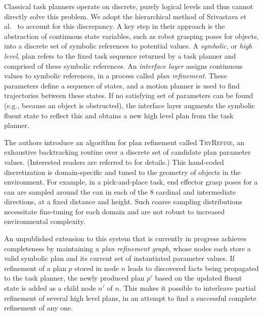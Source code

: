 
Classical task planners operate on discrete, purely logical levels and thus cannot directly
solve this problem. We adopt the hierarchical method of Srivastava et al.~\cite{srivastava2014combined}
to account for this discrepancy. A key step in their approach is the
abstraction of continuous state variables, such as robot grasping poses for objects, into a
discrete set of symbolic references to potential values. A \emph{symbolic}, or \emph{high level}, plan
refers to the fixed task sequence returned by a task planner and comprised of these symbolic references.
An \emph{interface layer} assigns continuous values to symbolic references, in a process called \emph{plan refinement}.
These parameters define a sequence of states, and a motion planner is used to find trajectories between these states.
If no satisfying set of parameters can be found (e.g., because an object is obstructed), the interface layer
augments the symbolic fluent state to reflect this and obtains a new high level plan from the task planner.

The authors introduce an algorithm for plan refinement
called \textsc{TryRefine}, an exhaustive backtracking routine over a discrete set of candidate
plan parameter values. (Interested readers are referred to \cite{srivastava2014combined} for details.)
This hand-coded discretization is domain-specific and tuned to the geometry of objects in the
environment. For example, in a pick-and-place task, end effector grasp poses for a can are
sampled around the can in each of the 8 cardinal and intermediate directions, at a fixed distance and height.
Such coarse sampling distributions necessitate fine-tuning for each domain and are not robust to
increased environmental complexity.

An unpublished extension to this system that is currently in progress achieves completeness by
maintaining a \emph{plan refinement graph}, whose nodes each store a valid symbolic plan and
its current set of instantiated parameter values. If refinement of a plan $p$ stored in node
$n$ leads to discovered facts being propagated to the task planner, the newly produced plan $p'$ based on
the updated fluent state is added as a child node $n'$ of $n$. This makes it possible to interleave
partial refinement of several high level plans, in an attempt to find a successful complete refinement
of any one.

